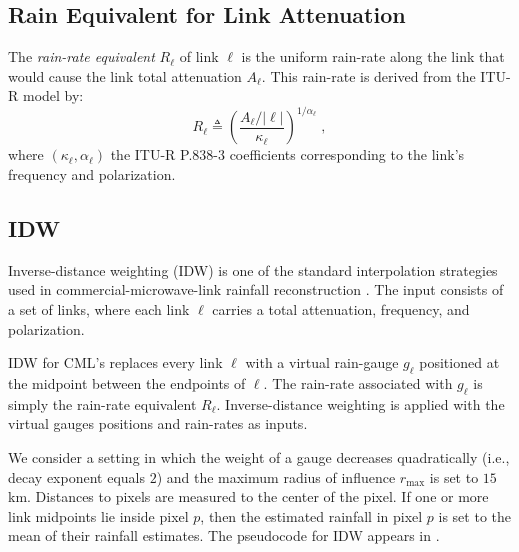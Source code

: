 \documentclass[a4paper,fleqn]{cas-sc}
\begin{document}
\subsection{Rain Equivalent for Link Attenuation}\label{sec:rain rate equivalent}
The \emph{rain-rate equivalent} $R_{\ell}$ of link $\ell$ is the uniform rain-rate along the link that would cause the link total attenuation $A_\ell$. This rain-rate is derived from the ITU-R model by:
\[
  R_\ell \triangleq \left(\frac{A_\ell/|\ell|}{\kappa_\ell}\right)^{1/\alpha_\ell}\;,
\]
where $(\kappa_\ell,\alpha_\ell)$ the ITU-R P.838-3 coefficients corresponding to the link's frequency and polarization.

\subsection{IDW}
Inverse-distance weighting (IDW) is one of the standard interpolation strategies used in commercial-microwave-link rainfall reconstruction
\citep{zimmerman1999experimental,jin2003comparison_krigbetter,chen2012estimation_idwforrain,chwala2019cml,eshel2020idw,eshel2021quantitative}.
The input consists of a set of links, where each link $\ell$ carries a total attenuation, frequency, and polarization.

IDW for CML's replaces every link $\ell$ with a virtual rain-gauge $g_{\ell}$ positioned at the midpoint between the endpoints of $\ell$. The rain-rate associated with $g_{\ell}$ is simply the rain-rate equivalent $R_{\ell}$. Inverse-distance weighting is applied with the virtual gauges positions and rain-rates as inputs.

We consider a setting in which the weight of a gauge decreases quadratically (i.e., decay exponent equals $2$) and the maximum radius of influence $r_{\max}$ is set to $15$ \si{\kilo\meter}. Distances to pixels are measured to the center of the pixel.
If one or more link midpoints lie inside pixel $p$, then the estimated rainfall in pixel $p$ is set to the mean of their rainfall estimates. The pseudocode for IDW appears in .
\end{document}
